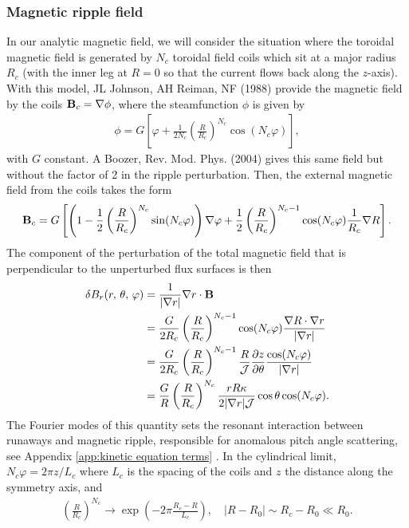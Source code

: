 \documentclass[11pt,a4paper]{article}
\renewcommand{\b}[1]{\ensuremath{ {\bf #1 } }}
\begin{document}
\subsubsection{Magnetic ripple field} \label{sec:ripple}
In our analytic magnetic field, we will consider the situation where the toroidal magnetic field is generated by $N_c$ toroidal field coils which sit at a major radius $R_c$ (with the inner leg at $R=0$ so that the current flows back along the $z$-axis). With this model, JL Johnson, AH Reiman, NF (1988) provide the magnetic field by the coils $\b{B}_c = \nabla \phi$, where the steamfunction $\phi$ is given by
\begin{align}
\phi = G\left[ \varphi + \frac{1}{2N_c}\left(\frac{R}{R_c}\right)^{N_c}\cos(N_c\varphi) \right],
\end{align}
with $G$ constant.
A Boozer, Rev. Mod. Phys. (2004) gives this same field but without the factor of 2 in the ripple perturbation. Then, the external magnetic field from the coils takes the form
\begin{align}
\b{B}_c = G\left[ \left(1 - \frac{1}{2}\left(\frac{R}{R_c}\right)^{N_c} \sin(N_c \varphi) \right)\nabla\varphi + \frac{1}{2} \left(\frac{R}{R_c}\right)^{N_c-1} \cos(N_c\varphi)\frac{1}{R_c}\nabla R \right].
\end{align}
The component of the perturbation of the total magnetic field that is perpendicular to the unperturbed flux surfaces is then
\begin{align}
\delta B_r(r,\,\theta,\,\varphi) &= \frac{1}{|\nabla r|}\nabla r \cdot \b{B} \nonumber \\
&=\frac{G}{2R_c} \left(\frac{R}{R_c}\right)^{N_c-1} \cos(N_c\varphi)\frac{\nabla R \cdot \nabla r}{|\nabla r|} \nonumber \\
&=\frac{G}{2R_c} \left(\frac{R}{R_c}\right)^{N_c-1} \frac{R}{\mathcal{J}}\frac{\partial z}{\partial \theta} \frac{\cos(N_c\varphi)}{|\nabla r|} \nonumber \\
&=\frac{G}{R} \left(\frac{R}{R_c}\right)^{N_c} \frac{rR\kappa}{2|\nabla r|\mathcal{J}} \cos\theta \cos(N_c\varphi) .
\end{align}
The Fourier modes of this quantity sets the resonant interaction between runaways and magnetic ripple, responsible for anomalous pitch angle scattering, see Appendix \ref{app:kinetic equation terms}
. In the cylindrical limit, $N_c \varphi = 2\pi z/L_c$ where $L_c$ is the spacing of the coils and $z$ the distance along the symmetry axis, and
\begin{align}
\left(\frac{R}{R_c}\right)^{N_c} \to \exp\left(- 2\pi\frac{R_c-R}{L_c} \right), \quad |R-R_0| \sim R_c-R_0 \ll R_0.
\end{align}
\end{document}
